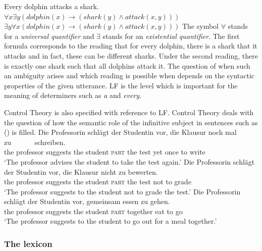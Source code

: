 \eal
\label{Beispiel-Every-man-loves-a-woman}
\ex Every dolphin attacks a shark.
\ex $\forall x \exists y (dolphin(x) \to (shark(y) \wedge attack(x,y)))$
\ex $\exists y \forall x (dolphin(x) \to (shark(y) \wedge attack(x,y)))$
\zl
The symbol $\forall$\is{$\forall$} stands for a \emph{universal quantifier} and $\exists$\is{$\exists$} stands for an
\emph{existential quantifier}. The first formula corresponds to the reading that for every dolphin, there is a shark that it attacks
and in fact, these can be different sharks. Under the second reading, there is exactly one shark such that all dolphins attack it. The question of when such an
ambiguity arises and which reading is possible when depends on the syntactic properties of the given utterance. LF is the level which is important for the
meaning of determiners such as \emph{a} and \emph{every}.

Control Theory is also specified with reference to LF. Control Theory deals with the question of how the semantic role of the infinitive
subject in sentences such as () is filled.
\eal
\ex 
\gll Die Professorin schlägt  der Studentin vor,          die Klausur noch mal  zu~~~~~~ schreiben.\\
     the professor   suggests the student   \textsc{part} the test    yet  once to write\\
\glt `The professor advises the student to take the test again.'
\ex 
\gll Die Professorin schlägt der Studentin vor, die Klausur nicht zu bewerten.\\
	 the professor suggests the student \textsc{part} the test not to grade\\
\glt `The professor suggests to the student not to grade the test.'
\ex 
\gll Die Professorin schlägt  der Studentin vor,          gemeinsam essen zu gehen.\hspace{-3pt}\\
     the professor   suggests the student   \textsc{part} together  eat   to go\\
\glt `The professor suggests to the student to go out for a meal together.'
\zl
{}

\subsubsection{The lexicon}
\label{Abschnitt-GB-Lexikon}

